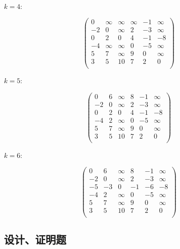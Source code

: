 \documentclass[a4paper]{article}
\begin{document}
\paragraph{$k=4:$}
$$
    \begin{pmatrix}
        0  & \infty & \infty & \infty & -1 & \infty \\
        -2 & 0      & \infty & 2      & -3 & \infty \\
        0  & 2      & 0      & 4      & -1 & -8     \\
        -4 & \infty & \infty & 0      & -5 & \infty \\
        5  & 7      & \infty & 9      & 0  & \infty \\
        3  & 5      & 10     & 7      & 2  & 0      \\
    \end{pmatrix}
$$
\paragraph{$k=5:$}
$$
    \begin{pmatrix}
        0  & 6 & \infty & 8 & -1 & \infty \\
        -2 & 0 & \infty & 2 & -3 & \infty \\
        0  & 2 & 0      & 4 & -1 & -8     \\
        -4 & 2 & \infty & 0 & -5 & \infty \\
        5  & 7 & \infty & 9 & 0  & \infty \\
        3  & 5 & 10     & 7 & 2  & 0      \\
    \end{pmatrix}
$$
\paragraph{$k=6:$}
$$
    \begin{pmatrix}
        0  & 6  & \infty & 8  & -1 & \infty \\
        -2 & 0  & \infty & 2  & -3 & \infty \\
        -5 & -3 & 0      & -1 & -6 & -8     \\
        -4 & 2  & \infty & 0  & -5 & \infty \\
        5  & 7  & \infty & 9  & 0  & \infty \\
        3  & 5  & 10     & 7  & 2  & 0      \\
    \end{pmatrix}
$$
\subsection{设计、证明题}
\end{document}
